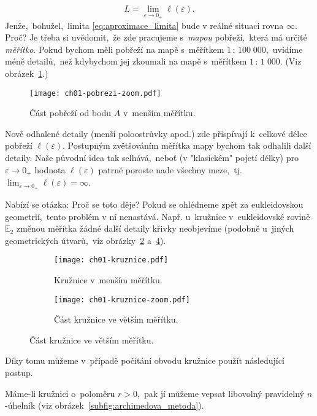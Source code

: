 \begin{equation}\label{eq:aproximace_limita}
    L=\lim_{\varepsilon\to0_+}{\ell(\varepsilon)}.
\end{equation}
Jenže,~bohužel,~limita \eqref{eq:aproximace_limita} bude v reálné situaci rovna $\infty$. Proč? Je třeba si uvědomit,~že zde pracujeme s~\emph{mapou} pobřeží,~která má určité \emph{měřítko}. Pokud bychom měli pobřeží na mapě s~měřítkem $1\,:\,100\;000$,~uvidíme méně detailů,~než kdybychom jej zkoumali na mapě s~měřítkem $1\,:\,1\;000$. (Viz obrázek~\ref{fig:pobrezi_zoom}.)\par
\begin{figure}[h]
    \centering
    \texttt{[image: ch01-pobrezi-zoom.pdf]}
    \caption{Část pobřeží od bodu $A$ v~menším měřítku.}
    \label{fig:pobrezi_zoom}
\end{figure}
Nově odhalené detaily (menší poloostrůvky apod.) zde přispívají k~celkové délce pobřeží $\ell(\varepsilon)$. Postupným zvětšováním měřítka mapy bychom tak odhalili další detaily. Naše původní idea tak selhává,~neboť (v "klasickém" pojetí délky) pro $\varepsilon\to0_+$ hodnota $\ell(\varepsilon)$ patrně poroste nade všechny meze,~tj. $\lim_{\varepsilon\to0_+}{\ell(\varepsilon)}=\infty$.\par
Nabízí se otázka: Proč se toto děje? Pokud se ohlédneme zpět za eukleidovskou geometrií,~tento problém v ní nenastává. Např. u~kružnice v~eukleidovské rovině $\mathbb{E}_2$ změnou měřítka žádné další detaily křivky neobjevíme (podobně u~jiných geometrických útvarů,~viz obrázky~\ref{subfig:kruznice} a~\ref{subfig:kruznice_zoom}). 
\begin{figure}[h]
    \centering
    \begin{subfigure}{\subfigwidth}
        \centering
        \texttt{[image: ch01-kruznice.pdf]}
        \caption{Kružnice v~menším měřítku.}
        \label{subfig:kruznice}
    \end{subfigure}
    \quad
    \begin{subfigure}{\subfigwidth}
        \centering
        \texttt{[image: ch01-kruznice-zoom.pdf]}
        \caption{Část kružnice ve větším měřítku.}
        \label{subfig:kruznice_zoom}
    \end{subfigure}
\end{figure}
Díky tomu můžeme v~případě počítání obvodu kružnice použít následující postup.\par
Máme-li kružnici o~poloměru $r>0$,~pak jí můžeme vepsat libovolný pravidelný $n$-úhelník (viz obrázek~\ref{subfig:archimedova_metoda}).

